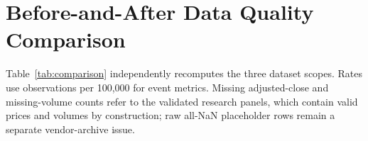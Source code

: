 \section{Before-and-After Data Quality Comparison}

Table~\ref{tab:comparison} independently recomputes the three dataset scopes.
Rates use observations per 100,000 for event metrics. Missing adjusted-close and
missing-volume counts refer to the validated research panels, which contain
valid prices and volumes by construction; raw all-NaN placeholder rows remain a
separate vendor-archive issue.

\begin{table}[H]
\centering
\caption{Original acquired, original liquidity-filtered, and final research panels}
\label{tab:comparison}
\scriptsize
{}
\end{table}
